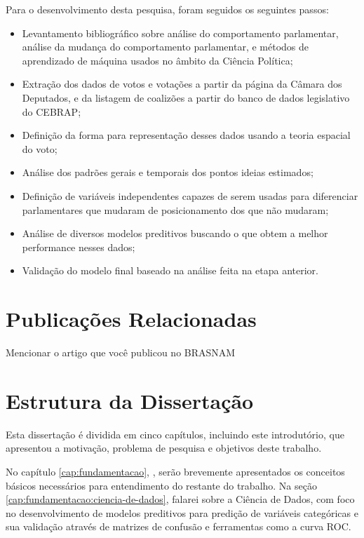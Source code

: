 Para o desenvolvimento desta pesquisa, foram seguidos os seguintes passos:

\begin{itemize}
  \item Levantamento bibliográfico sobre análise do comportamento parlamentar,
    análise da mudança do comportamento parlamentar, e métodos de aprendizado
    de máquina usados no âmbito da Ciência Política;
  \item Extração dos dados de votos e votações a partir da página da Câmara dos
    Deputados, e da listagem de coalizões a partir do banco de dados
    legislativo do \gls{CEBRAP};
  \item Definição da forma para representação desses dados usando a teoria
    espacial do voto;
  \item Análise dos padrões gerais e temporais dos pontos ideias estimados;
  \item Definição de variáveis independentes capazes de serem usadas para
    diferenciar parlamentares que mudaram de posicionamento dos que não
    mudaram;
  \item Análise de diversos modelos preditivos buscando o que obtem a melhor
    performance nesses dados;
  \item Validação do modelo final baseado na análise feita na etapa anterior.
\end{itemize}

\section{Publicações Relacionadas}

Mencionar o artigo que você publicou no BRASNAM

\section{Estrutura da Dissertação}

Esta dissertação é dividida em cinco capítulos, incluindo este introdutório,
que apresentou a motivação, problema de pesquisa e objetivos deste trabalho.

No capítulo \ref{cap:fundamentacao}, , serão
brevemente apresentados os conceitos básicos necessários para entendimento do
restante do trabalho. Na seção \ref{cap:fundamentacao:ciencia-de-dados}, falarei
sobre a Ciência de Dados, com foco no desenvolvimento de modelos preditivos
para predição de variáveis categóricas e sua validação através de matrizes de
confusão e ferramentas como a curva \gls{ROC}.

